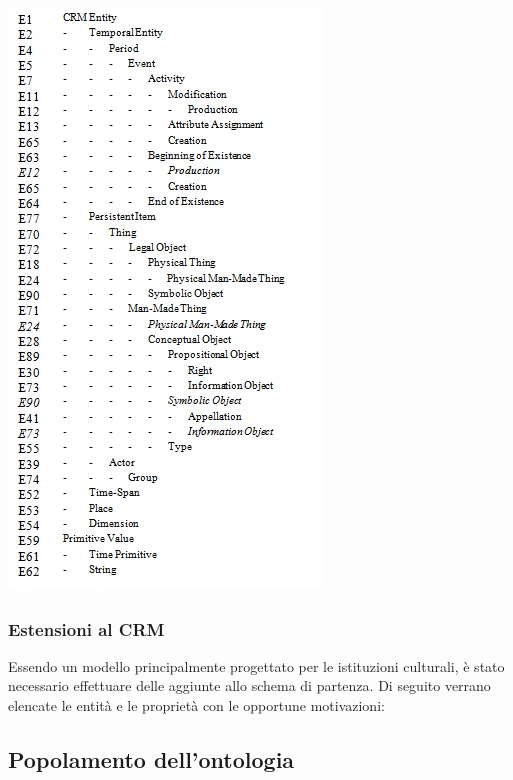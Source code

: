 \documentclass[11pt,a4paper]{article}
\begin{document}
\begin{center} 
	\includegraphics[scale=1.50]{immaginiTesina/ridotto.jpg}
\end{center}

\subsubsection{Estensioni al CRM}
Essendo un modello principalmente progettato per le istituzioni culturali, è stato necessario effettuare delle aggiunte allo schema di partenza. Di seguito verrano elencate le entità e le proprietà con le opportune motivazioni:

\subsection{Popolamento dell'ontologia}
\end{document}
